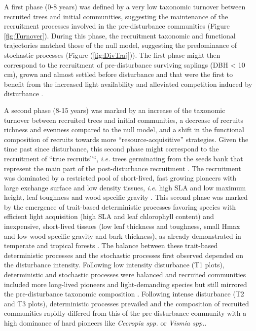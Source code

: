 \documentclass[fleqn,10pt]{ArtEcoFoG} %
\begin{document}
A first phase (0-8 years) was defined by a very low taxonomic turnover
between recruited trees and initial communities, suggesting the
maintenance of the recruitment processes involved in the pre-disturbance
communities (Figure \ref{fig:Turnover}). During this phase, the
recruitment taxonomic and functional trajectories matched those of the
null model, suggesting the predominance of stochastic processes (Figure
(\ref{fig:DivTraj})). The first phase might then correspond to the
recruitment of pre-disturbance surviving saplings (DBH \textless{} 10
cm), grown and almost settled before disturbance and that were the first
to benefit from the increased light availability and alleviated
competition induced by disturbance \citep{Denslow2000, Herault2010}.

A second phase (8-15 years) was marked by an increase of the taxonomic
turnover between recruited trees and initial communities, a decrease of
recruits richness and evenness compared to the null model, and a shift
in the functional composition of recruits towards more
``resource-acquisitive'' strategies. Given the time past since
disturbance, this second phase might correspond to the recruitment of
``true recruits''``, \emph{i.e.} trees germinating from the seeds bank
that represent the main part of the post-disturbance recruitment
\citep{Lawton1988}. The recruitment was dominated by a restricted pool
of short-lived, fast growing pioneers with large exchange surface and
low density tissues, \emph{i.e.} high SLA and low maximum height, leaf
toughness and wood specific gravity
\citep{Wright2004, Chave2009b, Herault2011}. This second phase was
marked by the emergence of trait-based deterministic processes favoring
species with efficient light acquisition (high SLA and leaf chlorophyll
content) and inexpensive, short-lived tissues (low leaf thickness and
toughness, small Hmax and low wood specific gravity and bark thickness),
as already demonstrated in temperate and tropical forests
\citep{Pena2008, Carreno2012, Kunstler2016, Both2019}. The balance
between these trait-based deterministic processes and the stochastic
processes first observed depended on the disturbance intensity.
Following low intensity disturbance (T1 plots), deterministic and
stochastic processes were balanced and recruited communities included
more long-lived pioneers and light-demanding species but still mirrored
the pre-disturbance taxonomic composition \citep{Bongers2009}. Following
intense disturbance (T2 and T3 plots), deterministic processes prevailed
and the composition of recruited communities rapidly differed from this
of the pre-disturbance community with a high dominance of hard pioneers
like \emph{Cecropia spp.} or \emph{Vismia spp.}.
\end{document}
